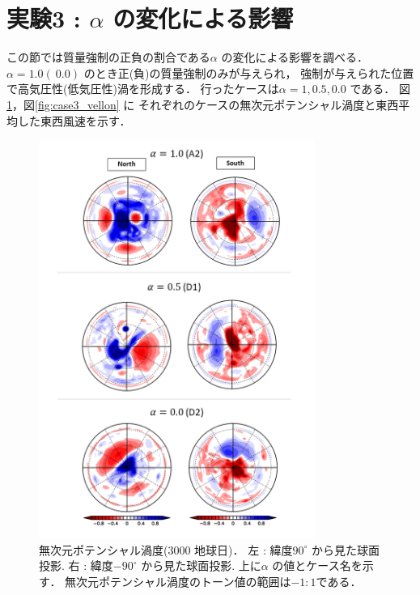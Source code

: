 \documentclass[a4j,12pt,openbib,oneside]{jreport}
\begin{document}
\section{実験3 : {$\alpha$} の変化による影響}
\label{sec:case3}
この節では質量強制の正負の割合である$\alpha$ の変化による影響を調べる．
$\alpha = 1.0 (~0.0)$ のとき正(負)の質量強制のみが与えられ，
強制が与えられた位置で高気圧性(低気圧性)渦を形成する．
行ったケースは$\alpha = 1, 0.5, 0.0$ である．
図\ref{fig:case3_nonqv}，図\ref{fig:case3_vellon} に
それぞれのケースの無次元ポテンシャル渦度と東西平均した東西風速を示す．
%
%
%
%
\begin{figure}[ht]
  \begin{center}
    \includegraphics[clip,width=9cm]{./fig/result/case3/case3_nonqv.png}
    \caption{
      \footnotesize{無次元ポテンシャル渦度(3000 地球日)．
左 : 緯度$90^\circ$ から見た球面投影.
右 : 緯度$-90^\circ$ から見た球面投影.
上に$\alpha$ の値とケース名を示す．
無次元ポテンシャル渦度のトーン値の範囲は$-1:1$である．
      }
    }
    \label{fig:case3_nonqv}
  \end{center}
\end{figure}
\end{document}
